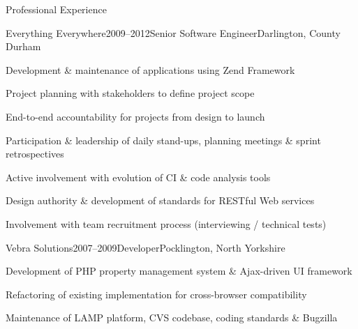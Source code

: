 \documentclass{cv}
\begin{document}
\begin{rSection}{Professional Experience}

\begin{rSubsection}{Everything Everywhere}{2009--2012}{Senior Software Engineer}{Darlington, County Durham}
\item Development \& maintenance of applications using Zend Framework
\item Project planning with stakeholders to define project scope
\item End-to-end accountability for projects from design to launch
\item Participation \& leadership of daily stand-ups, planning meetings \& sprint retrospectives
\item Active involvement with evolution of CI \& code analysis tools
\item Design authority \& development of standards for RESTful Web services
\item Involvement with team recruitment process (interviewing / technical tests)
\end{rSubsection}


\begin{rSubsection}{Vebra Solutions}{2007--2009}{Developer}{Pocklington, North Yorkshire}
\item Development of PHP property management system \& Ajax-driven UI framework
\item Refactoring of existing implementation for cross-browser compatibility
\item Maintenance of LAMP platform, CVS codebase, coding standards \& Bugzilla
\end{rSubsection}

\end{rSection}

\end{document}
